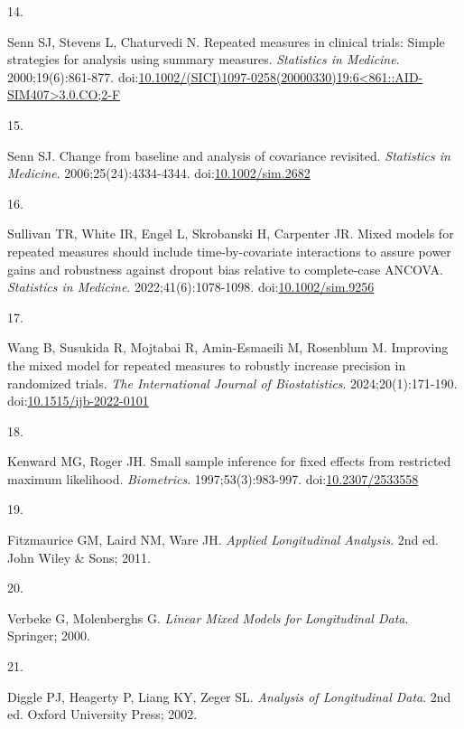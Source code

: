 \documentclass[
  11pt,
]{article}
\newlength{\cslhangindent}
\newlength{\csllabelwidth}
\newenvironment{CSLReferences}[2] %
 {\begin{list}{}{%
  \setlength{\itemindent}{0pt}
  \setlength{\leftmargin}{0pt}
  \setlength{\parsep}{0pt}
  \ifodd #1
   \setlength{\leftmargin}{\cslhangindent}
   \setlength{\itemindent}{-1\cslhangindent}
  \fi
  \setlength{\itemsep}{#2\baselineskip}}}
 {\end{list}}
\newcommand{\CSLLeftMargin}[1]{\parbox[t]{\csllabelwidth}{\strut#1\strut}}
\newcommand{\CSLRightInline}[1]{\parbox[t]{\linewidth - \csllabelwidth}{\strut#1\strut}}
\begin{document}
\begin{CSLReferences}{0}{1}
\CSLLeftMargin{14. }%
\CSLRightInline{Senn SJ, Stevens L, Chaturvedi N. Repeated measures in clinical trials: Simple strategies for analysis using summary measures. \emph{Statistics in Medicine}. 2000;19(6):861-877. doi:\href{https://doi.org/10.1002/(SICI)1097-0258(20000330)19:6\%3C861::AID-SIM407\%3E3.0.CO;2-F}{10.1002/(SICI)1097-0258(20000330)19:6\textless861::AID-SIM407\textgreater3.0.CO;2-F}}

\CSLLeftMargin{15. }%
\CSLRightInline{Senn SJ. Change from baseline and analysis of covariance revisited. \emph{Statistics in Medicine}. 2006;25(24):4334-4344. doi:\href{https://doi.org/10.1002/sim.2682}{10.1002/sim.2682}}

\CSLLeftMargin{16. }%
\CSLRightInline{Sullivan TR, White IR, Engel L, Skrobanski H, Carpenter JR. Mixed models for repeated measures should include time-by-covariate interactions to assure power gains and robustness against dropout bias relative to complete-case {ANCOVA}. \emph{Statistics in Medicine}. 2022;41(6):1078-1098. doi:\href{https://doi.org/10.1002/sim.9256}{10.1002/sim.9256}}

\CSLLeftMargin{17. }%
\CSLRightInline{Wang B, Susukida R, Mojtabai R, Amin-Esmaeili M, Rosenblum M. Improving the mixed model for repeated measures to robustly increase precision in randomized trials. \emph{The International Journal of Biostatistics}. 2024;20(1):171-190. doi:\href{https://doi.org/10.1515/ijb-2022-0101}{10.1515/ijb-2022-0101}}

\CSLLeftMargin{18. }%
\CSLRightInline{Kenward MG, Roger JH. Small sample inference for fixed effects from restricted maximum likelihood. \emph{Biometrics}. 1997;53(3):983-997. doi:\href{https://doi.org/10.2307/2533558}{10.2307/2533558}}

\CSLLeftMargin{19. }%
\CSLRightInline{Fitzmaurice GM, Laird NM, Ware JH. \emph{Applied Longitudinal Analysis}. 2nd ed. John Wiley \& Sons; 2011.}

\CSLLeftMargin{20. }%
\CSLRightInline{Verbeke G, Molenberghs G. \emph{Linear Mixed Models for Longitudinal Data}. Springer; 2000.}

\CSLLeftMargin{21. }%
\CSLRightInline{Diggle PJ, Heagerty P, Liang KY, Zeger SL. \emph{Analysis of Longitudinal Data}. 2nd ed. Oxford University Press; 2002.}


\end{CSLReferences}
\end{document}
